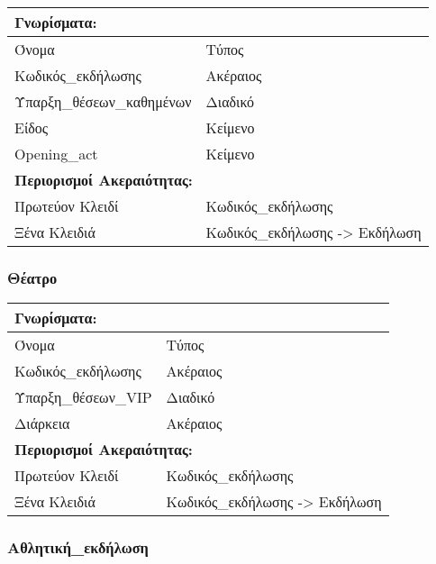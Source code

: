 \begin{tabular}{|p{6cm}|p{8cm}|}
  \multicolumn{2}{l}{\textbf{Γνωρίσματα:}}                   \\ \hline
  Όνομα                     & Τύπος                          \\ \hline
  Κωδικός\_εκδήλωσης        & Ακέραιος                       \\ \hline
  Ύπαρξη\_θέσεων\_καθημένων & Διαδικό                        \\ \hline
  Είδος                     & Κείμενο                        \\ \hline
  Opening\_act              & Κείμενο                        \\ \hline
  \multicolumn{2}{l}{\textbf{Περιορισμοί Ακεραιότητας:}}     \\ \hline
  Πρωτεύον Κλειδί           & Κωδικός\_εκδήλωσης             \\ \hline
  Ξένα Κλειδιά              & Κωδικός\_εκδήλωσης -> Εκδήλωση \\ \hline
\end{tabular}

\subsubsection*{Θέατρο}

\begin{tabular}{|p{6cm}|p{8cm}|}
  \multicolumn{2}{l}{\textbf{Γνωρίσματα:}}               \\ \hline
  Όνομα               & Τύπος                            \\ \hline
  Κωδικός\_εκδήλωσης  & Ακέραιος                         \\ \hline
  Ύπαρξη\_θέσεων\_VIP & Διαδικό                          \\ \hline
  Διάρκεια            & Ακέραιος                         \\ \hline
  \multicolumn{2}{l}{\textbf{Περιορισμοί Ακεραιότητας:}} \\ \hline
  Πρωτεύον Κλειδί     & Κωδικός\_εκδήλωσης               \\ \hline
  Ξένα Κλειδιά        & Κωδικός\_εκδήλωσης -> Εκδήλωση   \\ \hline
\end{tabular}

\subsubsection*{Αθλητική\_εκδήλωση}

